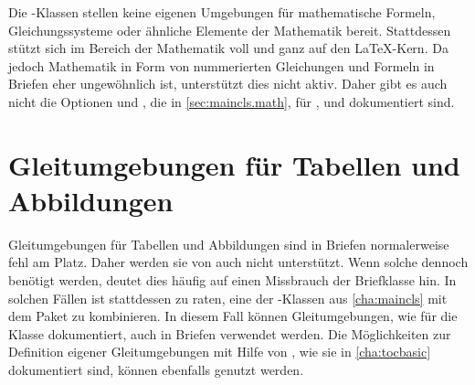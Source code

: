 Die \KOMAScript-Klassen stellen keine eigenen Umgebungen für mathematische
Formeln, Gleichungssysteme oder ähnliche Elemente der Mathematik
bereit. Stattdessen stützt sich \KOMAScript{} im Bereich der Mathematik voll
und ganz auf den \LaTeX-Kern. Da jedoch Mathematik in Form
von nummerierten Gleichungen und Formeln in Briefen eher ungewöhnlich ist,
unterstützt \KOMAScript{} dies nicht aktiv. Daher gibt es auch nicht die
Optionen  und ,
die in \autoref{sec:maincls.math},  für
,  und  dokumentiert sind.%
\iffalse%
  \par
  Auf eine Beschreibung der Mathematikumgebungen des \LaTeX-Kerns, also
  \Environment{displaymath}\IndexEnv{displaymath},
  \Environment{equation}\IndexEnv{equation} und
  \Environment{eqnarray}\IndexEnv{eqnarray}, wird an dieser Stelle
  verzichtet. Wer diese verwenden möchte, sei auf \cite{l2kurz} verwiesen. Für
  mehr als nur einfachste mathematische Formeln und Gleichungen sei jedoch die
  Verwendung von \Package{amsmath}\IndexPackage{amsmath} empfohlen (siehe
  \cite{package:amsmath}).%
\fi
%
\EndIndexGroup


\section{Gleitumgebungen für Tabellen und Abbildungen}

Gleitumgebungen für Tabellen und Abbildungen sind in Briefen normalerweise
fehl am Platz. Daher werden sie von  auch
nicht unterstützt. Wenn solche dennoch benötigt werden, deutet dies häufig auf
einen Missbrauch der Briefklasse hin. In solchen Fällen ist stattdessen zu
raten, eine der \KOMAScript-Klassen aus \autoref{cha:maincls} mit dem Paket
 zu kombinieren. In diesem
Fall können Gleitumgebungen, wie für die Klasse dokumentiert, auch in Briefen
verwendet werden. Die Möglichkeiten zur Definition eigener Gleitumgebungen mit
Hilfe von \hyperref[cha:tocbasic]{}%
, wie sie in
\autoref{cha:tocbasic} dokumentiert sind, können ebenfalls genutzt werden.



